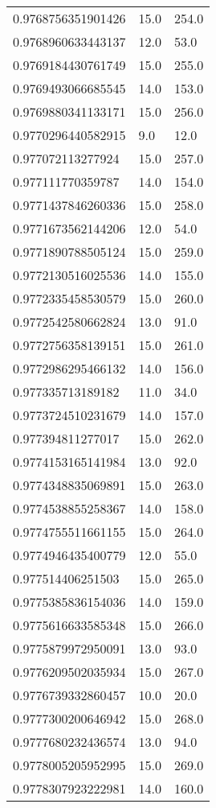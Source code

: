 \begin{center}
\begin{supertabular}[H]{p{0.30\textwidth}p{0.05\textwidth}p{0.05\textwidth}}
0.9768756351901426 & 15.0 & 254.0 \\ 
0.9768960633443137 & 12.0 & 53.0 \\ 
0.9769184430761749 & 15.0 & 255.0 \\ 
0.9769493066685545 & 14.0 & 153.0 \\ 
0.9769880341133171 & 15.0 & 256.0 \\ 
0.9770296440582915 & 9.0 & 12.0 \\ 
0.977072113277924 & 15.0 & 257.0 \\ 
0.977111770359787 & 14.0 & 154.0 \\ 
0.9771437846260336 & 15.0 & 258.0 \\ 
0.9771673562144206 & 12.0 & 54.0 \\ 
0.9771890788505124 & 15.0 & 259.0 \\ 
0.9772130516025536 & 14.0 & 155.0 \\ 
0.9772335458530579 & 15.0 & 260.0 \\ 
0.9772542580662824 & 13.0 & 91.0 \\ 
0.9772756358139151 & 15.0 & 261.0 \\ 
0.9772986295466132 & 14.0 & 156.0 \\ 
0.977335713189182 & 11.0 & 34.0 \\ 
0.9773724510231679 & 14.0 & 157.0 \\ 
0.977394811277017 & 15.0 & 262.0 \\ 
0.9774153165141984 & 13.0 & 92.0 \\ 
0.9774348835069891 & 15.0 & 263.0 \\ 
0.9774538855258367 & 14.0 & 158.0 \\ 
0.9774755511661155 & 15.0 & 264.0 \\ 
0.9774946435400779 & 12.0 & 55.0 \\ 
0.977514406251503 & 15.0 & 265.0 \\ 
0.9775385836154036 & 14.0 & 159.0 \\ 
0.9775616633585348 & 15.0 & 266.0 \\ 
0.9775879972950091 & 13.0 & 93.0 \\ 
0.9776209502035934 & 15.0 & 267.0 \\ 
0.9776739332860457 & 10.0 & 20.0 \\ 
0.9777300200646942 & 15.0 & 268.0 \\ 
0.9777680232436574 & 13.0 & 94.0 \\ 
0.9778005205952995 & 15.0 & 269.0 \\ 
0.9778307923222981 & 14.0 & 160.0 \\ 

\end{supertabular}
\end{center}
